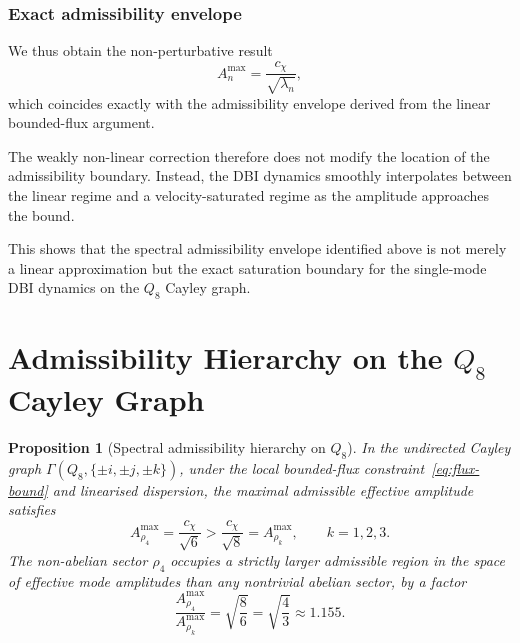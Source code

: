 \documentclass[11pt,a4paper]{article}
\newtheorem{proposition}{Proposition}
\begin{document}
    \subsubsection*{Exact admissibility envelope}

      We thus obtain the non-perturbative result
      \begin{equation}
        A_n^{\max}
        =
        \frac{c_\chi}{\sqrt{\lambda_n}},
      \end{equation}
      which coincides exactly with the admissibility envelope derived from the
      linear bounded-flux argument.

      The weakly non-linear correction therefore does not modify the
      location of the admissibility boundary.
      Instead, the DBI dynamics smoothly interpolates between the linear regime
      and a velocity-saturated regime as the amplitude approaches the bound.

      This shows that the spectral admissibility envelope identified above is not
      merely a linear approximation but the exact saturation boundary for the
      single-mode DBI dynamics on the $Q_8$ Cayley graph.

  \section{Admissibility Hierarchy on the $Q_8$ Cayley Graph}

  \begin{proposition}[Spectral admissibility hierarchy on $Q_8$]
    \label{prop:main}
    In the undirected Cayley graph $\Gamma(Q_8, \{\pm i, \pm j, \pm k\})$,
    under the local bounded-flux constraint~\eqref{eq:flux-bound} and linearised
    dispersion, the maximal admissible effective amplitude satisfies
    \begin{equation}
      A^{\max}_{\rho_4} = \frac{c_\chi}{\sqrt{6}}
      >
      \frac{c_\chi}{\sqrt{8}}
      = A^{\max}_{\rho_k},
      \qquad
      k = 1,2,3.
    \end{equation}
    The non-abelian sector $\rho_4$ occupies a strictly larger admissible region in the
    space of effective mode amplitudes than any nontrivial abelian sector, by a factor
    \begin{equation}
      \frac{A^{\max}_{\rho_4}}{A^{\max}_{\rho_k}}
      =
      \sqrt{\frac{8}{6}}
      =
      \sqrt{\frac{4}{3}}
      \approx 1.155.
    \end{equation}
  \end{proposition}
\end{document}
